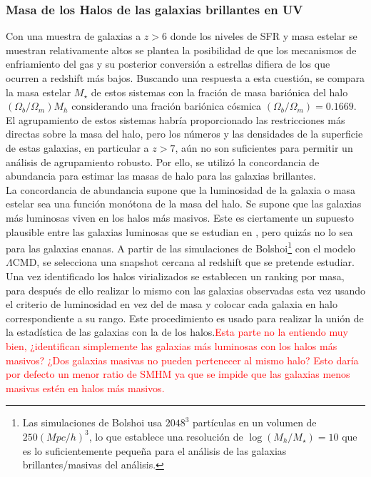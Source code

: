 \documentclass{article}
\begin{document}
\subsubsection*{Masa de los Halos de las galaxias brillantes en UV}
Con una muestra de galaxias a $z>6$ donde los niveles de SFR y masa estelar se muestran relativamente altos se plantea la posibilidad de que los mecanismos de enfriamiento del gas y su posterior conversión a estrellas difiera de los que ocurren a redshift más bajos. Buscando una respuesta a esta cuestión, se compara la masa estelar $M_\star$ de estos sistemas con la fración de masa bariónica del halo $(\Omega_b/\Omega_m)M_h$ considerando una fración bariónica cósmica $(\Omega_b/\Omega_m)=0.1669$. El agrupamiento de estos sistemas habría proporcionado las restricciones más directas sobre la masa del halo, pero los números y las densidades de la superficie de estas galaxias, en particular a $z> 7$, aún no son suficientes para permitir un análisis de agrupamiento robusto. Por ello, se utilizó la concordancia de abundancia para estimar las masas de halo para las galaxias brillantes. \\

La concordancia de abundancia supone que la luminosidad de la galaxia o masa estelar sea una función monótona de la masa del halo. Se supone que las galaxias más luminosas viven en los halos más masivos. Este es ciertamente un supuesto plausible entre las galaxias luminosas que se estudian en \cite{finkelstein2015increasing}, pero quizás no lo sea para las galaxias enanas. A partir de las simulaciones de Bolshoi\footnote{Las simulaciones de Bolshoi usa $2048^3$ partículas en un volumen de $250 (Mpc/h)^3$, lo que establece una resolución de $\log(M_h/M_\star)=10$ que es lo suficientemente pequeña para el análisis de las galaxias brillantes/masivas del análisis.} con el modelo $\Lambda$CMD, se selecciona una snapshot cercana al redshift que se pretende estudiar. Una vez identificado los halos virializados se establecen un ranking por masa, para después de ello realizar lo mismo con las galaxias observadas esta vez usando el criterio de luminosidad en vez del de masa y colocar cada galaxia en halo correspondiente a su rango. Este procedimiento es usado para realizar la unión de la estadística de las galaxias con la de los halos.\textcolor{red}{Esta parte no la entiendo muy bien, ¿identifican simplemente las galaxias más luminosas con los halos más masivos? ¿Dos galaxias masivas no pueden pertenecer al mismo halo? Esto daría por defecto un menor ratio de SMHM ya que se impide que las galaxias menos masivas estén en halos más masivos.}\\
\end{document}
